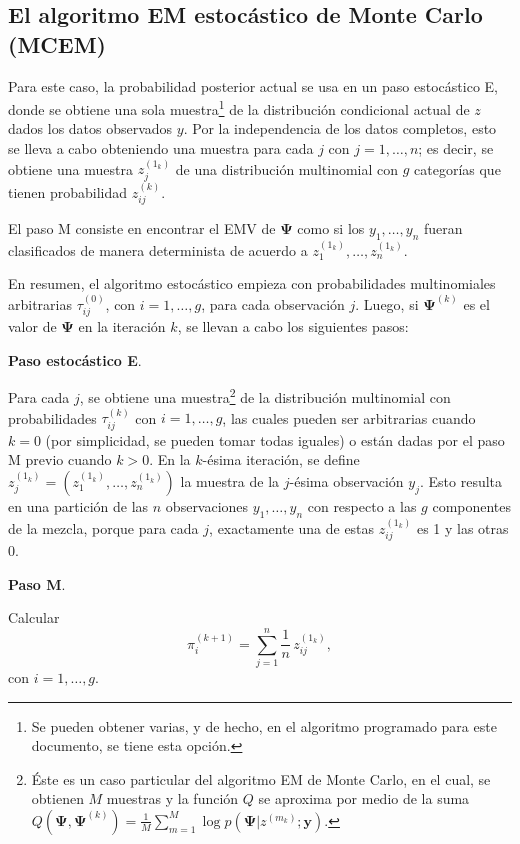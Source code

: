 \documentclass[
]{article}
\begin{document}
\subsection{El algoritmo EM estocástico de Monte Carlo (MCEM)}

Para este caso, la probabilidad posterior actual se usa en un paso
estocástico E, donde se obtiene una sola
muestra\footnote{Se pueden obtener varias, y de hecho, en el algoritmo programado para este documento, se tiene esta opción.}
de la distribución condicional actual de \(z\) dados los datos
observados \(y\). Por la independencia de los datos completos, esto se
lleva a cabo obteniendo una muestra para cada \(j\) con
\(j=1,\ldots,n\); es decir, se obtiene una muestra \(z_j^{(1_k)}\) de
una distribución multinomial con \(g\) categorías que tienen
probabilidad \(z_{ij}^{(k)}\).

El paso M consiste en encontrar el EMV de \(\bm{\Psi}\) como si los
\(y_1,\ldots,y_n\) fueran clasificados de manera determinista de acuerdo
a \(z_1^{(1_k)},\ldots,z_n^{(1_k)}\).

En resumen, el algoritmo estocástico empieza con probabilidades
multinomiales arbitrarias \(\tau_{ij}^{(0)}\), con \(i=1,\ldots,g\),
para cada observación \(j\). Luego, si \(\bm{\Psi}^{(k)}\) es el valor
de \(\bm{\Psi}\) en la iteración \(k\), se llevan a cabo los siguientes
pasos:

\textbf{Paso estocástico E}.

Para cada \(j\), se obtiene una
muestra\footnote{Éste es un caso particular del algoritmo EM de Monte Carlo, en el cual, se obtienen $M$ muestras y la función $Q$ se aproxima por medio de la suma  $Q(\bm{\Psi},\bm{\Psi}^{(k)})=\frac{1}{M} \sum_{m=1}^{M} \log p(\bm{\Psi} | z^{(m_k)};\bm{y})$.}
de la distribución multinomial con probabilidades \(\tau_{ij}^{(k)}\)
con \(i=1,\ldots,g\), las cuales pueden ser arbitrarias cuando \(k=0\)
(por simplicidad, se pueden tomar todas iguales) o están dadas por el
paso M previo cuando \(k>0\). En la \(k\)-ésima iteración, se define
\(z_j^{(1_k)}=(z_1^{(1_k)},\ldots,z_n^{(1_k)})\) la muestra de la
\(j\)-ésima observación \(y_j\). Esto resulta en una partición de las
\(n\) observaciones \(y_1,\ldots,y_n\) con respecto a las \(g\)
componentes de la mezcla, porque para cada \(j\), exactamente una de
estas \(z_{ij}^{(1_k)}\) es 1 y las otras 0.

\textbf{Paso M}.

Calcular \begin{equation}
\pi_i^{(k+1)}=\sum_{j=1}^n \frac{1}{n} \, z_{ij}^{(1_k)}, 
\end{equation} con \(i=1,\ldots,g\).
\end{document}
